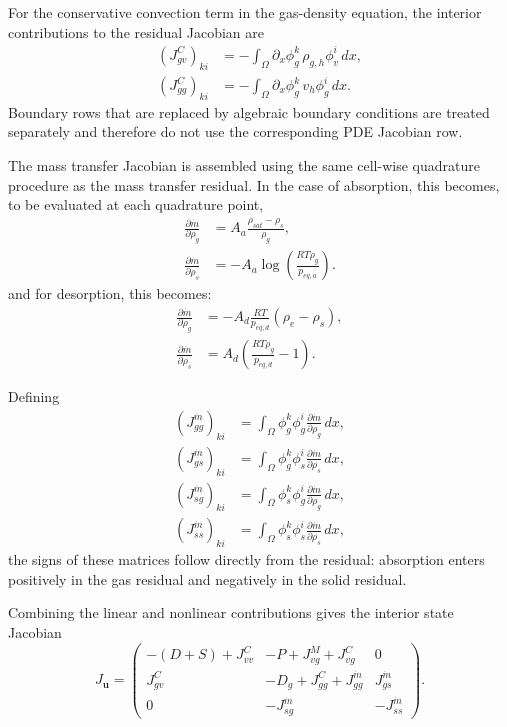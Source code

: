 For the conservative convection term in the gas-density equation, the interior contributions to the residual Jacobian are
\begin{align}
(J_{g v}^{C})_{ki}
&=-\int_\Omega\partial_x\phi_g^k\,\rho_{g,h}\phi_v^i\,dx,\\
(J_{gg}^{C})_{ki}
&=-\int_\Omega\partial_x\phi_g^k\,v_h\phi_g^i\,dx.
\end{align}
Boundary rows that are replaced by algebraic boundary conditions are treated separately and therefore do not use the corresponding PDE Jacobian row.

The mass transfer Jacobian is assembled using the same cell-wise quadrature procedure as the mass transfer residual. In the case of absorption, this becomes, to be evaluated at each quadrature point,
\begin{align}
\frac{\partial\dot m}{\partial\rho_g}
&=A_a\frac{\rho_{sat}-\rho_s}{\rho_g},\\
\frac{\partial\dot m}{\partial\rho_s}
&=-A_a\log\left(\frac{RT\rho_g}{p_{eq,a}}\right).
\end{align}
and for desorption, this becomes:
\begin{align}
\frac{\partial\dot m}{\partial\rho_g}
&=-A_d\frac{RT}{p_{eq,d}}{(\rho_{e}-\rho_s)},\\
\frac{\partial\dot m}{\partial\rho_s}
&=A_d\left(\frac{RT\rho_g}{p_{eq,d}}-1\right).
\end{align}

Defining
\begin{align}
(J_{gg}^{\dot m})_{ki}
&=\int_\Omega\phi_g^k\phi_g^i
\frac{\partial\dot m}{\partial\rho_g}\,dx,\\
(J_{gs}^{\dot m})_{ki}
&=\int_\Omega\phi_g^k\phi_s^i
\frac{\partial\dot m}{\partial\rho_s}\,dx,\\
(J_{sg}^{\dot m})_{ki}
&=\int_\Omega\phi_s^k\phi_g^i
\frac{\partial\dot m}{\partial\rho_g}\,dx,\\
(J_{ss}^{\dot m})_{ki}
&=\int_\Omega\phi_s^k\phi_s^i
\frac{\partial\dot m}{\partial\rho_s}\,dx,
\end{align}
the signs of these matrices follow directly from the residual: absorption enters positively in the gas residual and negatively in the solid residual.

Combining the linear and nonlinear contributions gives the interior state Jacobian
\begin{equation}\label{eq:model4_Ju}
J_{\mathbf u}=
\begin{pmatrix}
-(D+S)+J_{vv}^{C}&-P+J_{vg}^{M}+J_{vg}^{C}&0\\
J_{g v}^{C}&-D_g+J_{gg}^{C}+J_{gg}^{\dot m}&J_{gs}^{\dot m}\\
0&-J_{sg}^{\dot m}&-J_{ss}^{\dot m}
\end{pmatrix}.
\end{equation}

